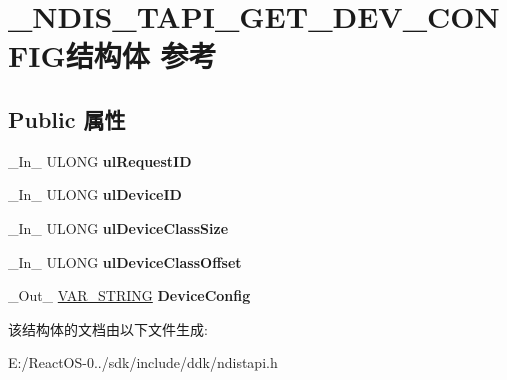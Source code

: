 \hypertarget{struct___n_d_i_s___t_a_p_i___g_e_t___d_e_v___c_o_n_f_i_g}{}\section{\+\_\+\+N\+D\+I\+S\+\_\+\+T\+A\+P\+I\+\_\+\+G\+E\+T\+\_\+\+D\+E\+V\+\_\+\+C\+O\+N\+F\+I\+G结构体 参考}
\label{struct___n_d_i_s___t_a_p_i___g_e_t___d_e_v___c_o_n_f_i_g}
\subsection*{Public 属性}
\begin{DoxyCompactItemize}
\item 
\mbox{\label{struct___n_d_i_s___t_a_p_i___g_e_t___d_e_v___c_o_n_f_i_g_a75ad170caba6f150ec95f1eff0b5a897}} 
\+\_\+\+In\+\_\+ U\+L\+O\+NG {\bfseries ul\+Request\+ID}
\item 
\mbox{\label{struct___n_d_i_s___t_a_p_i___g_e_t___d_e_v___c_o_n_f_i_g_a3f94286e4c4fa20837397450f8b7cefe}} 
\+\_\+\+In\+\_\+ U\+L\+O\+NG {\bfseries ul\+Device\+ID}
\item 
\mbox{\label{struct___n_d_i_s___t_a_p_i___g_e_t___d_e_v___c_o_n_f_i_g_a5c12584b562f55cfc62aa69d62d3b324}} 
\+\_\+\+In\+\_\+ U\+L\+O\+NG {\bfseries ul\+Device\+Class\+Size}
\item 
\mbox{\label{struct___n_d_i_s___t_a_p_i___g_e_t___d_e_v___c_o_n_f_i_g_a33d6346d31b7c10180c958a9718387be}} 
\+\_\+\+In\+\_\+ U\+L\+O\+NG {\bfseries ul\+Device\+Class\+Offset}
\item 
\mbox{\label{struct___n_d_i_s___t_a_p_i___g_e_t___d_e_v___c_o_n_f_i_g_a112af2966d4f90e91bf3ad4853c04c18}} 
\+\_\+\+Out\+\_\+ \hyperlink{struct___v_a_r___s_t_r_i_n_g}{V\+A\+R\+\_\+\+S\+T\+R\+I\+NG} {\bfseries Device\+Config}
\end{DoxyCompactItemize}


该结构体的文档由以下文件生成\+:\begin{DoxyCompactItemize}
\item 
E\+:/\+React\+O\+S-\/0../sdk/include/ddk/ndistapi.\+h\end{DoxyCompactItemize}
